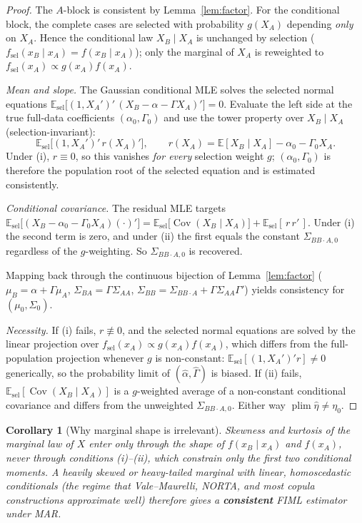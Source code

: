 \documentclass[11pt]{article}
\newcommand{\E}{\mathbb{E}}
\newcommand{\Cov}{\operatorname{Cov}}
\newcommand{\plim}{\operatorname*{plim}}
\theoremstyle{plain}
\newtheorem{corollary}{Corollary}
\theoremstyle{remark}
\begin{document}
\begin{proof}
The $A$-block is consistent by Lemma~\ref{lem:factor}. For the conditional
block, the complete cases are selected with probability $g(X_A)$ depending
\emph{only} on $X_A$. Hence the conditional law $X_B\mid X_A$ is unchanged by
selection ($f_{\mathrm{sel}}(x_B\mid x_A)=f(x_B\mid x_A)$); only the marginal of
$X_A$ is reweighted to $f_{\mathrm{sel}}(x_A)\propto g(x_A)f(x_A)$.

\emph{Mean and slope.} The Gaussian conditional MLE solves the selected normal
equations $\E_{\mathrm{sel}}\big[(1,X_A')'\,(X_B-\alpha-\Gamma X_A)'\big]=0$.
Evaluate the left side at the true full-data coefficients $(\alpha_0,\Gamma_0)$
and use the tower property over $X_B\mid X_A$ (selection-invariant):
\[
  \E_{\mathrm{sel}}\big[(1,X_A')'\,r(X_A)'\big],
  \qquad
  r(X_A) = \E[X_B\mid X_A]-\alpha_0-\Gamma_0 X_A .
\]
Under (i), $r\equiv 0$, so this vanishes \emph{for every} selection weight $g$;
$(\alpha_0,\Gamma_0)$ is therefore the population root of the selected equation
and is estimated consistently.

\emph{Conditional covariance.} The residual MLE targets
$\E_{\mathrm{sel}}\big[(X_B-\alpha_0-\Gamma_0X_A)(\cdot)'\big]
 = \E_{\mathrm{sel}}\!\big[\Cov(X_B\mid X_A)\big] + \E_{\mathrm{sel}}[\,r\,r'\,]$.
Under (i) the second term is zero, and under (ii) the first equals the constant
$\Sigma_{BB\cdot A,0}$ regardless of the $g$-weighting. So
$\Sigma_{BB\cdot A,0}$ is recovered.

Mapping back through the continuous bijection of Lemma~\ref{lem:factor}
($\mu_B=\alpha+\Gamma\mu_A$, $\Sigma_{BA}=\Gamma\Sigma_{AA}$,
$\Sigma_{BB}=\Sigma_{BB\cdot A}+\Gamma\Sigma_{AA}\Gamma'$) yields consistency for
$(\mu_0,\Sigma_0)$.

\emph{Necessity.} If (i) fails, $r\not\equiv0$, and the selected normal equations
are solved by the linear projection over $f_{\mathrm{sel}}(x_A)\propto
g(x_A)f(x_A)$, which differs from the full-population projection whenever $g$ is
non-constant: $\E_{\mathrm{sel}}[(1,X_A')'r]\ne0$ generically, so the probability
limit of $(\hat\alpha,\hat\Gamma)$ is biased. If (ii) fails,
$\E_{\mathrm{sel}}[\Cov(X_B\mid X_A)]$ is a $g$-weighted average of a
non-constant conditional covariance and differs from the unweighted
$\Sigma_{BB\cdot A,0}$. Either way $\plim\hat\eta\ne\eta_0$.
\end{proof}

\begin{corollary}[Why marginal shape is irrelevant]\label{cor:marginal}
Skewness and kurtosis of the marginal law of $X$ enter only through the
\emph{shape} of $f(x_B\mid x_A)$ and $f(x_A)$, never through conditions
(i)--(ii), which constrain only the first two conditional moments. A heavily
skewed or heavy-tailed marginal with linear, homoscedastic conditionals (the
regime that Vale--Maurelli, NORTA, and most copula constructions approximate
well) therefore gives a \textbf{consistent} FIML estimator under MAR.
\end{corollary}
\end{document}
